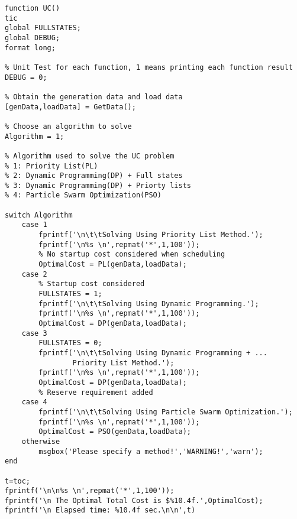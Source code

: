 \begin{verbatim}
function UC()
tic
global FULLSTATES;
global DEBUG;
format long;

% Unit Test for each function, 1 means printing each function result
DEBUG = 0;

% Obtain the generation data and load data
[genData,loadData] = GetData();

% Choose an algorithm to solve
Algorithm = 1;

% Algorithm used to solve the UC problem
% 1: Priority List(PL)
% 2: Dynamic Programming(DP) + Full states
% 3: Dynamic Programming(DP) + Priorty lists
% 4: Particle Swarm Optimization(PSO)

switch Algorithm
    case 1
        fprintf('\n\t\tSolving Using Priority List Method.');
        fprintf('\n%s \n',repmat('*',1,100'));
        % No startup cost considered when scheduling
        OptimalCost = PL(genData,loadData);
    case 2
        % Startup cost considered
        FULLSTATES = 1;
        fprintf('\n\t\tSolving Using Dynamic Programming.');
        fprintf('\n%s \n',repmat('*',1,100'));
        OptimalCost = DP(genData,loadData);
    case 3
        FULLSTATES = 0;
        fprintf('\n\t\tSolving Using Dynamic Programming + ... 
                Priority List Method.');
        fprintf('\n%s \n',repmat('*',1,100'));
        OptimalCost = DP(genData,loadData);
        % Reserve requirement added
    case 4
        fprintf('\n\t\tSolving Using Particle Swarm Optimization.');
        fprintf('\n%s \n',repmat('*',1,100'));
        OptimalCost = PSO(genData,loadData);
    otherwise
        msgbox('Please specify a method!','WARNING!','warn');
end

t=toc;
fprintf('\n\n%s \n',repmat('*',1,100'));
fprintf('\n The Optimal Total Cost is $%10.4f.',OptimalCost);
fprintf('\n Elapsed time: %10.4f sec.\n\n',t)
\end{verbatim}
